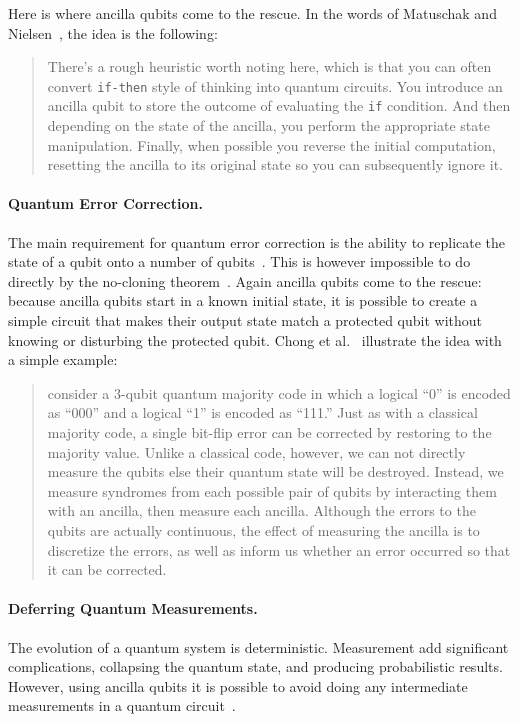 \documentclass[sigplan,10pt,review,anonymous]{acmart}
\begin{document}
Here is where ancilla qubits come to the rescue. In the words of
Matuschak and Nielsen~\cite{howgrover}, the idea is the following:
\begin{quote}
  There's a rough heuristic worth noting here, which is that you can
  often convert \verb|if-then| style of thinking into quantum
  circuits. You introduce an ancilla qubit to store the outcome of
  evaluating the \verb|if| condition. And then depending on the state
  of the ancilla, you perform the appropriate state
  manipulation. Finally, when possible you reverse the initial
  computation, resetting the ancilla to its original state so you can
  subsequently ignore it.
\end{quote}

\paragraph*{Quantum Error Correction.} The main requirement for
quantum error correction is the ability to replicate the state of a
qubit onto a number of qubits~\cite[Ch.~3]{NAP25196}. This is however
impossible to do directly by the no-cloning theorem~\cite{XXX}. Again ancilla
qubits come to the rescue: because ancilla qubits start in a known
initial state, it is possible to create a simple circuit that makes
their output state match a protected qubit without knowing or
disturbing the protected qubit. Chong et al.~\cite{sigarchblog}
illustrate the idea with a simple example:
\begin{quote}
consider a 3-qubit quantum majority code in which a logical ``0'' is
encoded as ``000'' and a logical ``1'' is encoded as ``111.''  Just as with
a classical majority code, a single bit-flip error can be corrected by
restoring to the majority value.  Unlike a classical code, however, we
can not directly measure the qubits else their quantum state will be
destroyed.  Instead, we measure syndromes from each possible pair of
qubits by interacting them with an ancilla, then measure each ancilla.
Although the errors to the qubits are actually continuous, the effect
of measuring the ancilla is to discretize the errors, as well as
inform us whether an error occurred so that it can be corrected.  
\end{quote}

\paragraph*{Deferring Quantum Measurements.} The evolution of a
quantum system is deterministic. Measurement add significant
complications, collapsing the quantum state, and producing
probabilistic results. However, using ancilla qubits it is possible to
avoid doing any intermediate measurements in a quantum
circuit~\cite{dewolf}. 
\end{document}

